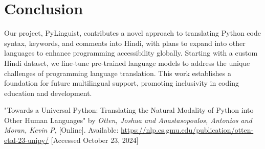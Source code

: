 \documentclass[9pt]{papertex}
\begin{document}
\section{Conclusion}
Our project, PyLinguist, contributes a novel approach to translating Python code syntax, keywords, and comments into Hindi, with plans to expand into other languages to enhance programming accessibility globally. Starting with a custom Hindi dataset, we fine-tune pre-trained language models to address the unique challenges of programming language translation. This work establishes a foundation for future multilingual support, promoting inclusivity in coding education and development. 


\begin{thebibliography}
    \bibitem[1]  "Towards a Universal Python: Translating the Natural Modality of Python into Other Human Languages" by \textit{Otten, Joshua and Anastasopoulos, Antonios and Moran, Kevin P}, [Online]. Available: \url{https://nlp.cs.gmu.edu/publication/otten-etal-23-unipy/} [Accessed October 23, 2024]
\end{thebibliography}
\end{document}
